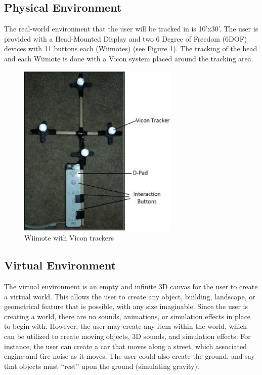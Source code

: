 \label{Design}
\subsection{Physical Environment}
\label{Design:PhysicalEnvironment}
The real-world environment that the user will be tracked in is 10'x30'.
The user is provided with a Head-Mounted Display and two 6 Degree of Freedom (6DOF) devices with 11 buttons each (Wiimotes) (see Figure \ref{fig:wiimote}).
The tracking of the head and each Wiimote is done with a Vicon system placed around the tracking area.

\begin{figure}[htbp]
	\centering
	\includegraphics[width=3in]{figs/wiimote.jpg}
	\caption{Wiimote with Vicon trackers}
	\label{fig:wiimote}
\end{figure}

\subsection{Virtual Environment}
\label{Design:VirtualEnvironment}
The virtual environment is an empty and infinite 3D canvas for the user to create a virtual world.
This allows the user to create any object, building, landscape, or geometrical feature that is possible, with any size imaginable.
Since the user is creating a world, there are no sounds, animations, or simulation effects in place to begin with.
However, the user may create any item within the world, which can be utilized to create moving objects, 3D sounds, and simulation effects.
For instance, the user can create a car that moves along a street, which associated engine and tire noise as it moves.
The user could also create the ground, and say that objects must ``rest'' upon the ground (simulating gravity).

